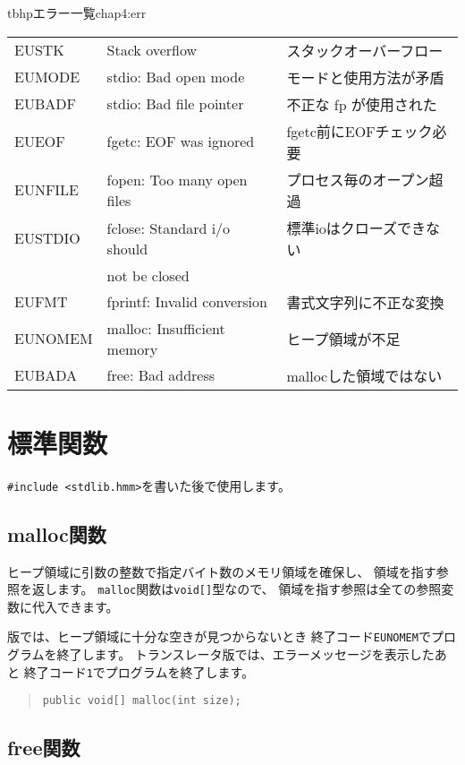 \begin{mytable}{tbhp}{エラー一覧}{chap4:err}
\begin{tabular}{l|l|l}
EUSTK     & Stack overflow              & スタックオーバーフロー \\
EUMODE    & stdio: Bad open mode        & モードと使用方法が矛盾 \\
EUBADF    & stdio: Bad file pointer     & 不正な fp が使用された \\
EUEOF     & fgetc: EOF was ignored      & fgetc前にEOFチェック必要 \\
EUNFILE   & fopen: Too many open files  & プロセス毎のオープン超過 \\
EUSTDIO   & fclose: Standard i/o should & 標準ioはクローズできない \\
          &  not be closed              &                          \\
EUFMT     & fprintf: Invalid conversion & 書式文字列に不正な変換 \\
EUNOMEM   & malloc: Insufficient memory & ヒープ領域が不足 \\
EUBADA    & free: Bad address           & mallocした領域ではない \\
\end{tabular}
\end{mytable}

\section{標準関数}

\verb/#include <stdlib.hmm>/を書いた後で使用します。

\subsection{malloc関数}

ヒープ領域に引数の整数で指定バイト数のメモリ領域を確保し、
領域を指す参照を返します。
\verb/malloc/関数は\verb/void[]/型なので、
領域を指す参照は全ての参照変数に代入できます。

\tac 版では、ヒープ領域に十分な空きが見つからないとき
終了コード\verb/EUNOMEM/でプログラムを終了します。
トランスレータ版では、エラーメッセージを表示したあと
終了コード\verb/1/でプログラムを終了します。

\begin{quote}
\begin{verbatim}
public void[] malloc(int size);
\end{verbatim}
\end{quote}

\subsection{free関数}

